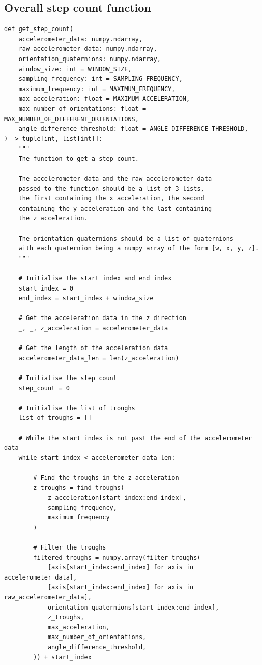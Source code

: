 \documentclass[12pt]{report}
\begin{document}
\subsection{Overall step count function}
\label{sec:orge69ac94}
\begin{verbatim}
def get_step_count(
    accelerometer_data: numpy.ndarray,
    raw_accelerometer_data: numpy.ndarray,
    orientation_quaternions: numpy.ndarray,
    window_size: int = WINDOW_SIZE,
    sampling_frequency: int = SAMPLING_FREQUENCY,
    maximum_frequency: int = MAXIMUM_FREQUENCY,
    max_acceleration: float = MAXIMUM_ACCELERATION,
    max_number_of_orientations: float = MAX_NUMBER_OF_DIFFERENT_ORIENTATIONS,
    angle_difference_threshold: float = ANGLE_DIFFERENCE_THRESHOLD,
) -> tuple[int, list[int]]:
    """
    The function to get a step count.

    The accelerometer data and the raw accelerometer data
    passed to the function should be a list of 3 lists,
    the first containing the x acceleration, the second
    containing the y acceleration and the last containing
    the z acceleration.

    The orientation quaternions should be a list of quaternions
    with each quaternion being a numpy array of the form [w, x, y, z].
    """

    # Initialise the start index and end index
    start_index = 0
    end_index = start_index + window_size

    # Get the acceleration data in the z direction
    _, _, z_acceleration = accelerometer_data

    # Get the length of the acceleration data
    accelerometer_data_len = len(z_acceleration)

    # Initialise the step count
    step_count = 0

    # Initialise the list of troughs
    list_of_troughs = []

    # While the start index is not past the end of the accelerometer data
    while start_index < accelerometer_data_len:

        # Find the troughs in the z acceleration
        z_troughs = find_troughs(
            z_acceleration[start_index:end_index],
            sampling_frequency,
            maximum_frequency
        )

        # Filter the troughs
        filtered_troughs = numpy.array(filter_troughs(
            [axis[start_index:end_index] for axis in accelerometer_data],
            [axis[start_index:end_index] for axis in raw_accelerometer_data],
            orientation_quaternions[start_index:end_index],
            z_troughs,
            max_acceleration,
            max_number_of_orientations,
            angle_difference_threshold,
        )) + start_index


\end{verbatim}
\end{document}
